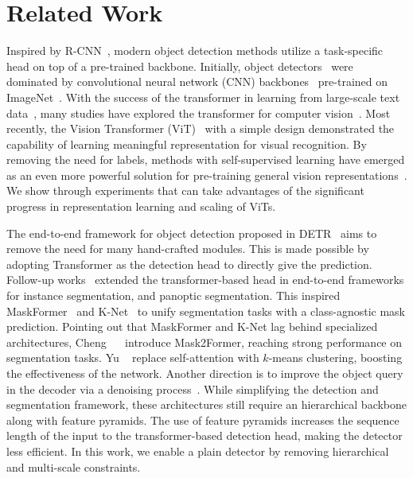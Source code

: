 \section{Related Work}
\label{sec:related_work}

 Inspired by R-CNN~\cite{girshick2014rcnn}, modern object detection methods utilize a task-specific head on top of a pre-trained backbone. Initially, object detectors~\cite{simonyan2015vgg,xie2017resnext,kaiming2016resnet,huang2017densenet} were dominated by convolutional neural network (CNN) backbones~\cite{lecun95convolutional} pre-trained on ImageNet~\cite{deng2009imagenet}. With the success of the transformer in learning from large-scale text data~\cite{brown2020gpt3,devlin2019bert}, many studies have explored the transformer for computer vision~\cite{chen2020igpt,dosovitskiy2021vit,liu2021swintransformer}. Most recently, the Vision Transformer (ViT)~\cite{dosovitskiy2021vit} with a simple design demonstrated the capability of learning meaningful representation for visual recognition. By removing the need for labels, methods with self-supervised learning have emerged as an even more powerful solution for pre-training general vision representations~\cite{chen2020simclr,he2022mae}. We show through experiments that \ours can take advantages of the significant progress in representation learning and scaling of ViTs.


 The end-to-end framework for object detection proposed in DETR~\cite{nicolas2020detr} aims to remove the need for many hand-crafted modules. This is made possible by adopting Transformer as the detection head to directly give the prediction. Follow-up works~\cite{dong2021solq,wang2021maxdeeplab,nguyen2022boxer} extended the transformer-based head in end-to-end frameworks for instance segmentation, and panoptic segmentation. This inspired MaskFormer~\cite{cheng2021maskformer} and K-Net~\cite{zhang2021knet} to unify segmentation tasks with a class-agnostic mask prediction. Pointing out that MaskFormer and K-Net lag behind specialized architectures, Cheng \etal~~\cite{cheng2022mask2former} introduce Mask2Former, reaching strong performance on segmentation tasks. Yu \etal~\cite{yu2022kmmask} replace self-attention with $k$-means clustering, boosting the effectiveness of the network. Another direction is to improve the object query in the decoder via a denoising process~\cite{zhang2023dino,li2023maskdino}. While simplifying the detection and segmentation framework, these architectures still require an hierarchical backbone along with feature pyramids. The use of feature pyramids increases the sequence length of the input to the transformer-based detection head, making the detector less efficient. In this work, we enable a plain detector by removing hierarchical and multi-scale constraints.

